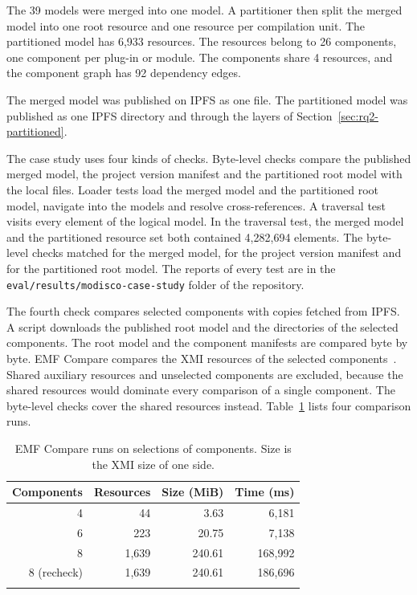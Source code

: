 \documentclass[iicol,pdflatex,sn-mathphys-num]{sn-jnl}
\theoremstyle{thmstylethree}%
\begin{document}
The 39 models were merged into one model. A partitioner then split the merged model into one root resource and one resource per compilation unit. The partitioned model has 6,933 resources. The resources belong to 26 components, one component per plug-in or module. The components share 4 resources, and the component graph has 92 dependency edges.

The merged model was published on IPFS as one file. The partitioned model was published as one IPFS directory and through the layers of Section~\ref{sec:rq2-partitioned}.

The case study uses four kinds of checks. Byte-level checks compare the published merged model, the project version manifest and the partitioned root model with the local files. Loader tests load the merged model and the partitioned root model, navigate into the models and resolve cross-references. A traversal test visits every element of the logical model. In the traversal test, the merged model and the partitioned resource set both contained 4,282,694 elements. The byte-level checks matched for the merged model, for the project version manifest and for the partitioned root model. The reports of every test are in the \texttt{eval/results/modisco-case-study} folder of the repository.

The fourth check compares selected components with copies fetched from IPFS. A script downloads the published root model and the directories of the selected components. The root model and the component manifests are compared byte by byte. EMF Compare compares the XMI resources of the selected components~\cite{emfcompare}. Shared auxiliary resources and unselected components are excluded, because the shared resources would dominate every comparison of a single component. The byte-level checks cover the shared resources instead. Table~\ref{tab:compare} lists four comparison runs.

\begin{table}[t]
\caption{EMF Compare runs on selections of components. Size is the XMI size of one side.}\label{tab:compare}
\setlength{\tabcolsep}{4pt}
\begin{tabular}{@{}rrrr@{}}
\toprule
Components & Resources & Size (MiB) & Time (ms) \\
\midrule
4 & 44 & 3.63 & 6,181 \\
6 & 223 & 20.75 & 7,138 \\
8 & 1,639 & 240.61 & 168,992 \\
8 (recheck) & 1,639 & 240.61 & 186,696 \\
\botrule
\end{tabular}
\end{table}
\end{document}
